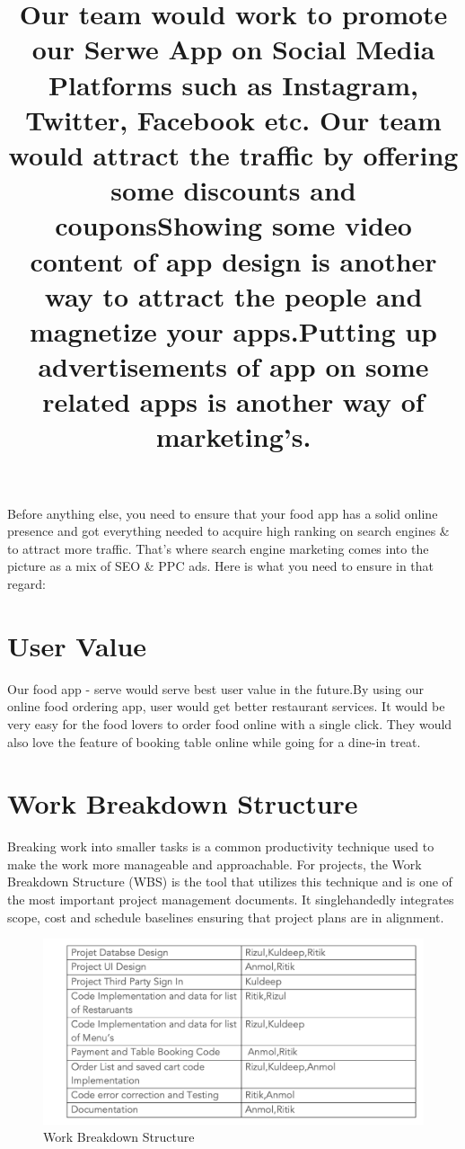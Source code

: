 \documentclass[12pt]{article}
\begin{document}
Before anything else, you need to ensure that your food app has a solid online presence and got everything needed to acquire high ranking on search engines & to attract more traffic. That’s where search engine marketing comes into the picture as a mix of SEO & PPC ads. Here is what you need to ensure in that regard:

\title{Our team would work to promote our Serwe App on Social Media Platforms such as Instagram, Twitter, Facebook etc. }

\title{Our team would attract the traffic by offering some discounts and coupons}

\title{Showing some video content of app design is another way to attract the people and magnetize your apps.}


\title{Putting up advertisements of app on some related apps is another way of marketing's.}

\section{User Value}

Our food app - serve would serve best user value in the future.By using our online food ordering app, user would get better restaurant services. It would be very easy for the food lovers to order food online with a single click. They would also love the feature of booking table online while going for a dine-in treat.\\ \newline
\section{Work Breakdown Structure}
Breaking work into smaller tasks is a common productivity technique used to make the work more manageable and approachable. For projects, the Work Breakdown Structure (WBS) is the tool that utilizes this technique and is one of the most important project management documents. It singlehandedly integrates scope, cost and schedule baselines ensuring that project plans are in alignment.
\begin{figure}
\centering
\includegraphics[scale=0.55]{wbspic.png}
\caption{Work Breakdown Structure}
\end{figure}
\end{document}
